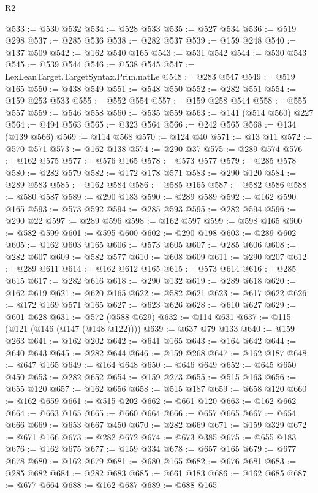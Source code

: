 \begin{lexlean}{R2}
\begin{coremodule}
@533 := @530 @532
@534 := @528 @533
@535 := @527 @534
@536 := @519 @298
@537 := @285 @536
@538 := @282 @537
@539 := @159 @248
@540 := @137 @509
@542 := @162 @540 @165
@543 := @531 @542
@544 := @530 @543
@545 := @539 @544
@546 := @538 @545
@547 := LexLeanTarget.TargetSyntax.Prim.natLe
@548 := @283 @547
@549 := @519 @165
@550 := @438 @549
@551 := @548 @550
@552 := @282 @551
@554 := @159 @253 @533
@555 := @552 @554
@557 := @159 @258 @544
@558 := @555 @557
@559 := @546 @558
@560 := @535 @559
@563 := @141 (@514 @560) @227
@564 := @494 @563
@565 := @323 @564
@566 := @242 @565
@568 := @134 (@139 @566)
@569 := @114 @568
@570 := @124 @40
@571 := @13 @11
@572 := @570 @571
@573 := @162 @138
@574 := @290 @37
@575 := @289 @574
@576 := @162 @575
@577 := @576 @165
@578 := @573 @577
@579 := @285 @578
@580 := @282 @579
@582 := @172 @178 @571
@583 := @290 @120
@584 := @289 @583
@585 := @162 @584
@586 := @585 @165
@587 := @582 @586
@588 := @580 @587
@589 := @290 @183
@590 := @289 @589
@592 := @162 @590 @165
@593 := @573 @592
@594 := @285 @593
@595 := @282 @594
@596 := @290 @22
@597 := @289 @596
@598 := @162 @597
@599 := @598 @165
@600 := @582 @599
@601 := @595 @600
@602 := @290 @198
@603 := @289 @602
@605 := @162 @603 @165
@606 := @573 @605
@607 := @285 @606
@608 := @282 @607
@609 := @582 @577
@610 := @608 @609
@611 := @290 @207
@612 := @289 @611
@614 := @162 @612 @165
@615 := @573 @614
@616 := @285 @615
@617 := @282 @616
@618 := @290 @132
@619 := @289 @618
@620 := @162 @619
@621 := @620 @165
@622 := @582 @621
@623 := @617 @622
@626 := @172 @169 @571 @165
@627 := @623 @626
@628 := @610 @627
@629 := @601 @628
@631 := @572 (@588 @629)
@632 := @114 @631
@637 := @115 (@121 (@146 (@147 (@148 @122))))
@639 := @637 @79 @133
@640 := @159 @263
@641 := @162 @202
@642 := @641 @165
@643 := @164 @642
@644 := @640 @643
@645 := @282 @644
@646 := @159 @268
@647 := @162 @187
@648 := @647 @165
@649 := @164 @648
@650 := @646 @649
@652 := @645 @650 @450
@653 := @282 @652
@654 := @159 @273
@655 := @515 @163
@656 := @655 @120
@657 := @162 @656
@658 := @515 @187
@659 := @658 @120
@660 := @162 @659
@661 := @515 @202
@662 := @661 @120
@663 := @162 @662
@664 := @663 @165
@665 := @660 @664
@666 := @657 @665
@667 := @654 @666
@669 := @653 @667 @450
@670 := @282 @669
@671 := @159 @329
@672 := @671 @166
@673 := @282 @672
@674 := @673 @385
@675 := @655 @183
@676 := @162 @675
@677 := @159 @334
@678 := @657 @165
@679 := @677 @678
@680 := @162 @679
@681 := @680 @165
@682 := @676 @681
@683 := @285 @682
@684 := @282 @683
@685 := @661 @183
@686 := @162 @685
@687 := @677 @664
@688 := @162 @687
@689 := @688 @165

\end{coremodule}
\end{lexlean}
